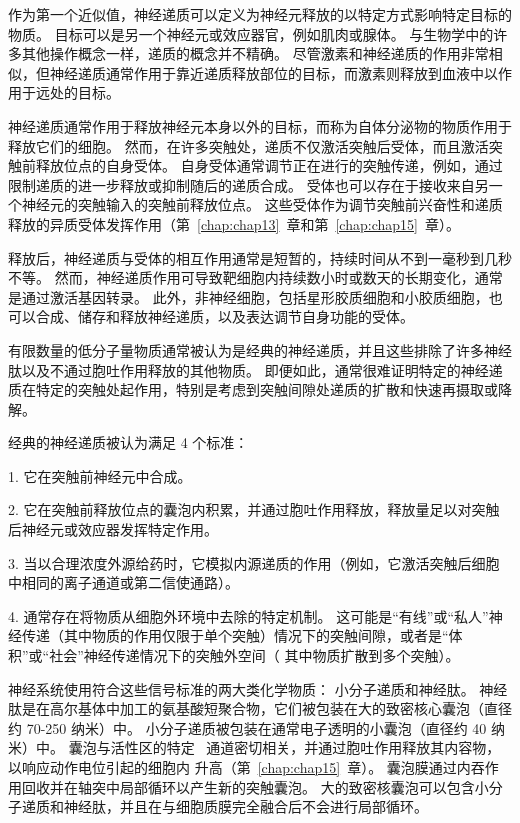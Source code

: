 作为第一个近似值，神经递质可以定义为神经元释放的以特定方式影响特定目标的物质。
目标可以是另一个神经元或效应器官，例如肌肉或腺体。 
与生物学中的许多其他操作概念一样，递质的概念并不精确。
尽管激素和神经递质的作用非常相似，但神经递质通常作用于靠近递质释放部位的目标，而激素则释放到血液中以作用于远处的目标。


神经递质通常作用于释放神经元本身以外的目标，而称为自体分泌物的物质作用于释放它们的细胞。
然而，在许多突触处，递质不仅激活突触后受体，而且激活突触前释放位点的自身受体。
自身受体通常调节正在进行的突触传递，例如，通过限制递质的进一步释放或抑制随后的递质合成。
受体也可以存在于接收来自另一个神经元的突触输入的突触前释放位点。
这些受体作为调节突触前兴奋性和递质释放的异质受体发挥作用（第~\ref{chap:chap13}~章和第~\ref{chap:chap15}~章）。


释放后，神经递质与受体的相互作用通常是短暂的，持续时间从不到一毫秒到几秒不等。
然而，神经递质作用可导致靶细胞内持续数小时或数天的长期变化，通常是通过激活基因转录。
此外，非神经细胞，包括星形胶质细胞和小胶质细胞，也可以合成、储存和释放神经递质，以及表达调节自身功能的受体。


有限数量的低分子量物质通常被认为是经典的神经递质，并且这些排除了许多神经肽以及不通过胞吐作用释放的其他物质。
即便如此，通常很难证明特定的神经递质在特定的突触处起作用，特别是考虑到突触间隙处递质的扩散和快速再摄取或降解。


经典的神经递质被认为满足 4 个标准：

1. 它在突触前神经元中合成。

2. 它在突触前释放位点的囊泡内积累，并通过胞吐作用释放，释放量足以对突触后神经元或效应器发挥特定作用。

3. 当以合理浓度外源给药时，它模拟内源递质的作用（例如，它激活突触后细胞中相同的离子通道或第二信使通路）。

4. 通常存在将物质从细胞外环境中去除的特定机制。 这可能是“有线”或“私人”神经传递（其中物质的作用仅限于单个突触）情况下的突触间隙，或者是“体积”或“社会”神经传递情况下的突触外空间（ 其中物质扩散到多个突触）。


神经系统使用符合这些信号标准的两大类化学物质：
小分子递质和神经肽。
神经肽是在高尔基体中加工的氨基酸短聚合物，它们被包装在大的致密核心囊泡（直径约 70-250 纳米）中。
小分子递质被包装在通常电子透明的小囊泡（直径约 40 纳米）中。
囊泡与活性区的特定~ 通道密切相关，并通过胞吐作用释放其内容物，以响应动作电位引起的细胞内  升高（第~\ref{chap:chap15}~章）。
囊泡膜通过内吞作用回收并在轴突中局部循环以产生新的突触囊泡。
大的致密核囊泡可以包含小分子递质和神经肽，并且在与细胞质膜完全融合后不会进行局部循环。



